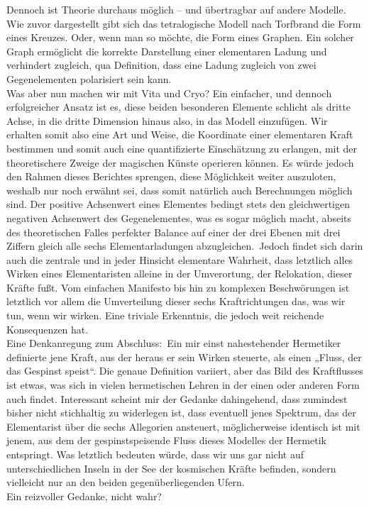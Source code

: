 \documentclass[a5paper,8pt]{book}
\begin{document}
Dennoch ist Theorie durchaus möglich – und übertragbar auf andere Modelle. Wie zuvor dargestellt gibt sich das tetralogische Modell nach Torfbrand die Form eines Kreuzes. Oder, 
wenn man so möchte, die Form eines Graphen. Ein solcher Graph ermöglicht die korrekte Darstellung einer elementaren Ladung und verhindert zugleich, qua Definition, dass eine 
Ladung zugleich von zwei Gegenelementen polarisiert sein kann.\\
Was aber nun machen wir mit Vita und Cryo? Ein einfacher, und dennoch erfolgreicher Ansatz ist es, diese beiden besonderen Elemente schlicht als dritte Achse, in die dritte 
Dimension hinaus also, in das Modell einzufügen. Wir erhalten somit also eine Art und Weise, die Koordinate einer elementaren Kraft bestimmen und somit auch eine quantifizierte 
Einschätzung zu erlangen, mit der theoretischere Zweige der magischen Künste operieren können.
Es würde jedoch den Rahmen dieses Berichtes sprengen, diese Möglichkeit weiter auszuloten, weshalb nur noch erwähnt sei, dass somit natürlich auch Berechnungen möglich sind. 
Der positive Achsenwert eines Elementes bedingt stets den gleichwertigen negativen Achsenwert des Gegenelementes, was es sogar möglich macht, abseits des theoretischen Falles 
perfekter Balance auf einer der drei Ebenen mit drei Ziffern gleich alle sechs Elementarladungen abzugleichen.\
Jedoch findet sich darin auch die zentrale und in jeder Hinsicht elementare Wahrheit, dass letztlich alles Wirken eines Elementaristen alleine in der Umverortung, der Relokation, 
dieser Kräfte fußt. Vom einfachen Manifesto bis hin zu komplexen Beschwörungen ist letztlich vor allem die Umverteilung dieser sechs Kraftrichtungen das, was wir tun, wenn wir 
wirken.
Eine triviale Erkenntnis, die jedoch weit reichende Konsequenzen hat.\\

Eine Denkanregung zum Abschluss:\
Ein mir einst nahestehender Hermetiker definierte jene Kraft, aus der heraus er sein Wirken steuerte, als einen „Fluss, der das Gespinst speist“. Die genaue Definition variiert, 
aber das Bild des Kraftflusses ist etwas, was sich in vielen hermetischen Lehren in der einen oder anderen Form auch findet.
Interessant scheint mir der Gedanke dahingehend, dass zumindest bisher nicht stichhaltig zu widerlegen ist, dass eventuell jenes Spektrum, das der Elementarist über die sechs 
Allegorien ansteuert, möglicherweise identisch ist mit jenem, aus dem der gespinstspeisende Fluss dieses Modelles der Hermetik entspringt.
Was letztlich bedeuten würde, dass wir uns gar nicht auf unterschiedlichen Inseln in der See der kosmischen Kräfte befinden, sondern vielleicht nur an den beiden 
gegenüberliegenden Ufern.\\
Ein reizvoller Gedanke, nicht wahr?\\
\end{document}
